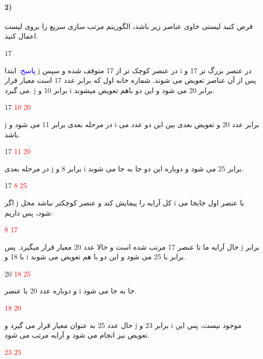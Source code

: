 \documentclass[10pt,a4paper]{article}
\begin{document}
	\paragraph{2)} فرض کنید لیستی حاوی عناصر زیر باشد، الگوریتم مرتب سازی سریع را بروی لیست اعمال کنید.
	\begin{flushleft}
		\begin{latin}
			17       
		\end{latin}
	\end{flushleft}
	\begin{flushright} 
		\textcolor{blue}{پاسخ:}
	ابتدا j در عنصر کوچک تر از 17 متوقف شده و سپس i در عنصر بزرگ تر 17 و پس از آن عناصر تعویض می شوند.
	شماره خانه اول که برابر عدد 17 است معیار قرار می گیرد. j برابر 10 و  i برابر 20 می شود و این دو باهم تعویض میشوند.
		\begin{latin}
			17 \; \textcolor{red}{10} \; \textcolor{red}{20}     
		\end{latin}
		j در مرحله بعدی برابر 11 می شود و i برابر عدد 20 و تعویض بعدی بین این دو عدد می باشد.
		\begin{latin}
		17  \; \textcolor{red}{11}  \; \textcolor{red}{20}   
		\end{latin}
	در مرحله بعدی j برابر 8 و i برابر 25 می شود و دوباره این دو جا به جا می شوند.
		\begin{latin}
		17   \; \textcolor{red}{8}  \; \textcolor{red}{25}  
		\end{latin}
	اگر j کل آرایه را پیمایش کند و عنصر کوچکتر نباشد محل i با عنصر اول جابجا می شود، پس داریم:
		\begin{latin}
		\textcolor{red}{8}   \; \textcolor{red}{17}    
		\end{latin}
	حال آرایه ما تا عنصر 17 مرتب شده است و حالا عدد 20 معیار قرار میگیرد. پس j برابر با 18 و i برابر با 25 می شود و این دو با هم تعویض می شوند.
		\begin{latin}
		20 \; \textcolor{red}{18} \; \textcolor{red}{25} 
		\end{latin}
	و دوباره عدد 20 با عنصر i جا به جا می شود.
		\begin{latin}
		\textcolor{red}{18} \; \textcolor{red}{20}  
		\end{latin}
	حال عدد 25 به عنوان معیار قرار می گیرد و j برابر 23 و i موجود نیست، پس این تعویض نیز انجام می شود و آرایه مرتب می شود.
		\begin{latin}
		\textcolor{red}{23} \; \textcolor{red}{25}
		\end{latin}
	\end{flushright}
\end{document}
